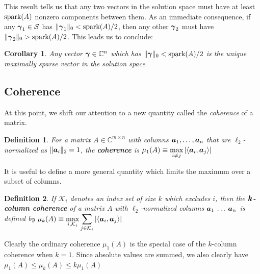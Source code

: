 \documentclass[twocolumn]{gwclass}
\newtheorem{corollary}{Corollary}[theorem]
\newtheorem{definition}{Definition}
\newcommand{\C}{\mathbb{C}}
\begin{document}
	This result tells us that any two vectors in the solution space must have at least $\text{\normalfont{spark}}(A)$ nonzero components between them. As an immediate consequence, if any $\boldsymbol{\gamma}_1\in\mathcal{S}$ has $\|\boldsymbol{\gamma}_1\|_0 < \text{\normalfont{spark}}(A)/2$, then any other $\boldsymbol{\gamma}_2$ must have $\|\boldsymbol{\gamma}_2\|_0>\text{\normalfont{spark}}(A)/2$. This leads us to conclude:
	
	\begin{corollary}
		Any vector $\*\gamma\in\C^n$ which has $\|\boldsymbol{\gamma}\|_0 < \text{\normalfont{spark}}(A)/2$ is the unique maximally sparse vector in the solution space
	\end{corollary}
	
	\subsection{Coherence}
	At this point, we shift our attention to a new quantity called the \emph{coherence} of a matrix.
	
	\begin{definition}
		For a matrix $A\in\C^{m\times n}$ with columns $\boldsymbol{a}_1, \dots,\boldsymbol{a}_n$ that are $\ell_2$-normalized as $\|\boldsymbol{a}_i\|_2=1$, the \textbf{coherence} is
		 $\displaystyle\mu_1(A)\equiv \max_{i\neq j} \abs{\langle \boldsymbol{a}_i, \boldsymbol{a}_j\rangle}$
	\end{definition}
	It is useful to define a more general quantity which limits the maximum over a subset of columns.
	
	\begin{definition}
		If $\mathcal{K}_i$ denotes an index set of size $k$ which excludes $i$, then the $\boldsymbol{k}$\textbf{-column coherence} of a matrix $A$ with $\ell_2$-normalized columns $\boldsymbol{a}_1 \:\dots\:\boldsymbol{a}_n$ is defined by $\displaystyle\mu_k(A)\equiv  \max_{i,\mathcal{K}_i }\sum_{j\in\mathcal{K}_i} \abs{\langle\boldsymbol{a}_i,\boldsymbol{a}_j\rangle}$
	\end{definition}
	Clearly the ordinary coherence $\mu_1(A)$ is the special case of the $k$-column coherence when $k=1$. Since absolute values are summed, we also clearly have $\mu_1(A) \leq \mu_k(A) \leq k \mu_1(A)$
	
\end{document}
